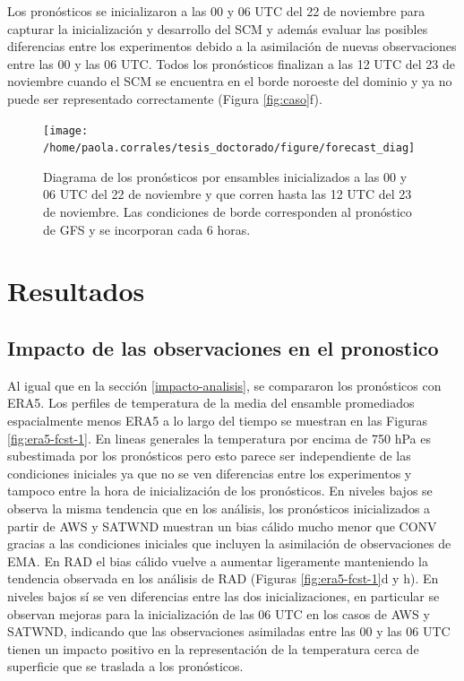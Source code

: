 \documentclass[12pt,oneside]{reedthesis}
\begin{document}
Los pronósticos se inicializaron a las 00 y 06 UTC del 22 de noviembre para capturar la inicialización y desarrollo del SCM y además evaluar las posibles diferencias entre los experimentos debido a la asimilación de nuevas observaciones entre las 00 y las 06 UTC. Todos los pronósticos finalizan a las 12 UTC del 23 de noviembre cuando el SCM se encuentra en el borde noroeste del dominio y ya no puede ser representado correctamente (Figura \ref{fig:caso}f).


\begin{figure}
\texttt{[image: /home/paola.corrales/tesis\_doctorado/figure/forecast\_diag]} \caption{Diagrama de los pronósticos por ensambles inicializados a las 00 y 06 UTC del 22 de noviembre y que corren hasta las 12 UTC del 23 de noviembre. Las condiciones de borde corresponden al pronóstico de GFS y se incorporan cada 6 horas.}\label{fig:cycle-fcst}
\end{figure}
\hypertarget{resultados-1}{%
\section{Resultados}\label{resultados-1}}

\hypertarget{prono-impacto}{%
\subsection{Impacto de las observaciones en el pronostico}\label{prono-impacto}}

Al igual que en la sección \ref{impacto-analisis}, se compararon los pronósticos con ERA5. Los perfiles de temperatura de la media del ensamble promediados espacialmente menos ERA5 a lo largo del tiempo se muestran en las Figuras \ref{fig:era5-fcst-1}. En lineas generales la temperatura por encima de 750 hPa es subestimada por los pronósticos pero esto parece ser independiente de las condiciones iniciales ya que no se ven diferencias entre los experimentos y tampoco entre la hora de inicialización de los pronósticos. En niveles bajos se observa la misma tendencia que en los análisis, los pronósticos inicializados a partir de AWS y SATWND muestran un bias cálido mucho menor que CONV gracias a las condiciones iniciales que incluyen la asimilación de observaciones de EMA. En RAD el bias cálido vuelve a aumentar ligeramente manteniendo la tendencia observada en los análisis de RAD (Figuras \ref{fig:era5-fcst-1}d y h). En niveles bajos sí se ven diferencias entre las dos inicializaciones, en particular se observan mejoras para la inicialización de las 06 UTC en los casos de AWS y SATWND, indicando que las observaciones asimiladas entre las 00 y las 06 UTC tienen un impacto positivo en la representación de la temperatura cerca de superficie que se traslada a los pronósticos.
\end{document}
